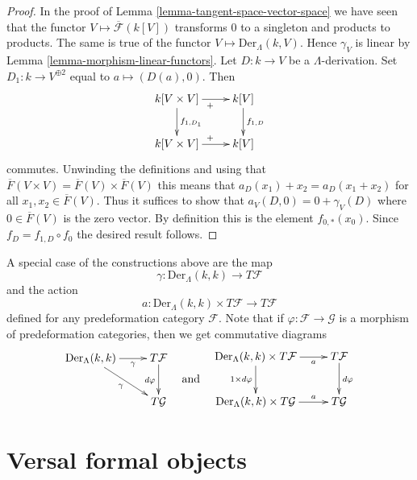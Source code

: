 \begin{proof}
In the proof of
Lemma \ref{lemma-tangent-space-vector-space}
we have seen that the functor $V \mapsto \overline{\mathcal{F}}(k[V])$
transforms $0$ to a singleton and products to products. The same is
true of the functor $V \mapsto \text{Der}_\Lambda(k, V)$.
Hence $\gamma_V$ is linear by
Lemma \ref{lemma-morphism-linear-functors}.
Let $D : k \to V$ be a $\Lambda$-derivation.
Set $D_1 : k \to V^{\oplus 2}$ equal to $a \mapsto (D(a), 0)$.
Then
$$
\xymatrix{
k[V \times V] \ar[r]_{+} \ar[d]^{f_{1, D_1}} & k[V] \ar[d]^{f_{1, D}} \\
k[V \times V] \ar[r]^{+} & k[V]
}
$$
commutes. Unwinding the definitions and using that
$\overline{F}(V \times V) = \overline{F}(V) \times \overline{F}(V)$
this means that $a_D(x_1) + x_2 = a_D(x_1 + x_2)$ for all
$x_1, x_2 \in \overline{F}(V)$. Thus it suffices to show that
$a_V(D, 0) = 0 + \gamma_V(D)$ where $0 \in \overline{F}(V)$ is
the zero vector. By definition this is the element $f_{0, *}(x_0)$.
Since $f_D = f_{1, D} \circ f_0$ the desired result follows.
\end{proof}

\noindent
A special case of the constructions above are the map
\begin{equation}
\label{equation-map}
\gamma : \text{Der}_\Lambda(k, k) \longrightarrow T\mathcal{F}
\end{equation}
and the action
\begin{equation}
\label{equation-action}
a : \text{Der}_\Lambda(k, k) \times T\mathcal{F} \longrightarrow T\mathcal{F}
\end{equation}
defined for any predeformation category $\mathcal{F}$.
Note that if $\varphi : \mathcal{F} \to \mathcal{G}$ is a morphism
of predeformation categories, then we get commutative diagrams
$$
\vcenter{
\xymatrix{
\text{Der}_\Lambda(k, k) \ar[r]_-\gamma \ar[rd]_\gamma &
T\mathcal{F} \ar[d]_{d\varphi} \\
& T\mathcal{G}
}
}
\quad\text{and}\quad
\vcenter{
\xymatrix{
\text{Der}_\Lambda(k, k) \times T\mathcal{F} \ar[r]_-a
\ar[d]_{1 \times d\varphi} &
T\mathcal{F} \ar[d]^{d\varphi} \\
\text{Der}_\Lambda(k, k) \times T\mathcal{G} \ar[r]^-a &
T\mathcal{G}
}
}
$$










\section{Versal formal objects}
\label{section-versal-objects}

